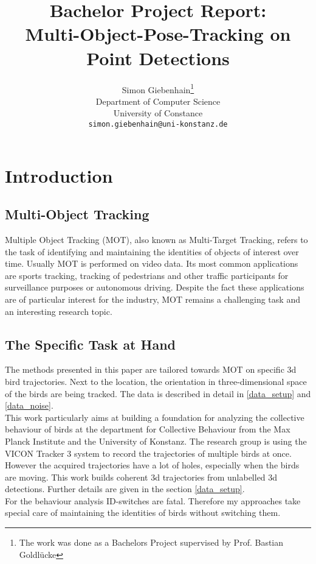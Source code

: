 \documentclass{article}
\title{Bachelor Project Report: \\ Multi-Object-Pose-Tracking on Point Detections}
\author{
  Simon Giebenhain\thanks{The work was done as a Bachelors Project supervised by Prof. Bastian Goldlücke} \\
  Department of Computer Science\\
  University of Constance\\
  \texttt{simon.giebenhain@uni-konstanz.de} \\
}
\begin{document}
\maketitle

\begin{abstract}
\end{abstract}




\section{Introduction}


\subsection{Multi-Object Tracking}

Multiple Object Tracking (MOT), also known as Multi-Target Tracking, refers to the task of identifying and maintaining the identities of objects of interest over time. Usually MOT is performed on video data. Its most common applications are sports tracking, tracking of pedestrians and other traffic participants for surveillance purposes or autonomous driving. Despite the fact these applications are of particular interest for the industry, MOT remains a challenging task and an interesting research topic.


\subsection{The Specific Task at Hand}

The methods presented in this paper are tailored towards MOT on specific 3d bird trajectories. Next to the location, the orientation in three-dimensional space of the birds are being tracked. The data is described in detail in \ref{data_setup} and \ref{data_noise}.\\
This work particularly aims at building a foundation for analyzing the collective behaviour of birds at the department for Collective Behaviour from the Max Planck Institute and the University of Konstanz. The research group is using the VICON Tracker 3 system %
to record the trajectories of multiple birds at once. However the acquired trajectories have a lot of holes, especially when the birds are moving. This work builds coherent 3d trajectories from unlabelled 3d detections. Further details are given in the section \ref{data_setup}.\\
For the behaviour analysis ID-switches are fatal. Therefore my approaches take special care of maintaining the identities of birds without switching them.
\end{document}
